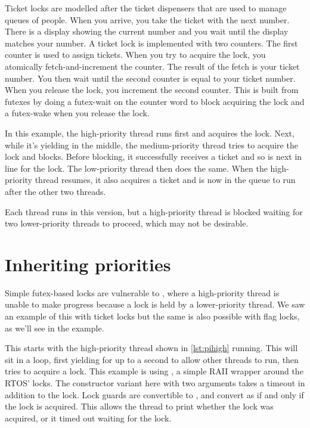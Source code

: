 Ticket locks are modelled after the ticket dispensers that are used to manage queues of people.
When you arrive, you take the ticket with the next number.
There is a display showing the current number and you wait until the display matches your number.
A ticket lock is implemented with two counters.
The first counter is used to assign tickets.
When you try to acquire the lock, you atomically fetch-and-increment the counter.
The result of the fetch is your ticket number.
You then wait until the second counter is equal to your ticket number.
When you release the lock, you increment the second counter.
This is built from futexes by doing a futex-wait on the counter word to block acquiring the lock and a futex-wake when you release the lock.

In this example, the high-priority thread runs first and acquires the lock.
Next, while it's yielding in the middle, the medium-priority thread tries to acquire the lock and blocks.
Before blocking, it successfully receives a ticket and so is next in line for the lock.
The low-priority thread then does the same.
When the high-priority thread resumes, it also acquires a ticket and is now in the queue to run after the other two threads.

Each thread runs in this version, but a high-priority thread is blocked waiting for two lower-priority threads to proceed, which may not be desirable.

\section[label=priority_inheritance]{Inheriting priorities}

Simple futex-based locks are vulnerable to , where a high-priority thread is unable to make progress because a lock is held by a lower-priority thread.
We saw an example of this with ticket locks but the same is also possible with flag locks, as we'll see in the  example.

This starts with the high-priority thread shown in \ref{lst:pihigh} running.
This will sit in a loop, first yielding for up to a second to allow other threads to run, then tries to acquire a lock.
This example is using , a simple RAII wrapper around the RTOS' locks.
The constructor variant here with two arguments takes a timeout in addition to the lock.
Lock guards are convertible to , and convert as  if and only if the lock is acquired.
This allows the thread to print whether the lock was acquired, or it timed out waiting for the lock.


